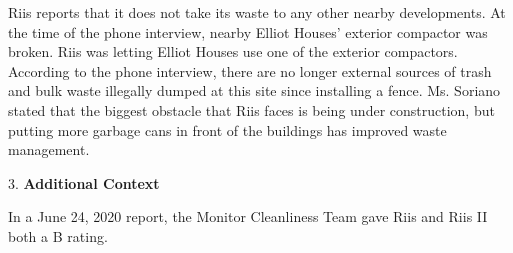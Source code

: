 Riis reports that it does not take its waste to any other nearby developments. At the time of the phone interview, nearby Elliot Houses' exterior compactor was broken. Riis was letting Elliot Houses use one of the exterior compactors. According to the phone interview, there are no longer external sources of trash and bulk waste illegally dumped at this site since installing a fence. Ms. Soriano stated that the biggest obstacle that Riis faces is being under construction, but putting more garbage cans in front of the buildings has improved waste management.  

3. \textbf{Additional Context}

In a June 24, 2020 report, the Monitor Cleanliness Team gave Riis and Riis II both a B rating. 